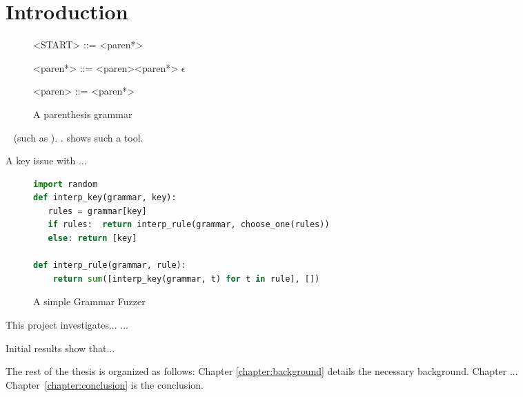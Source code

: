 \chapter{Introduction}\label{chapter:intro}

\lipsum[20]

\begin{wrapfigure}{r}{0.35\textwidth}
\small
\center
\begin{grammar}
<START> ::= <paren*>

<paren*> ::= <paren><paren*>
\alt $\epsilon$

<paren>  ::= \term{(} <paren*> \term{)}
\end{grammar}
\caption{A parenthesis grammar}
\label{fig:parenthesis}
\end{wrapfigure}
\lipsum[10]~\cite{Gopinath2019} \lipsum[100] (such as ). \lipsum[100].  shows such a tool.

A key issue with  ...

\begin{figure}
\small
\begin{lstlisting}[language=Python]
import random
def interp_key(grammar, key):
   rules = grammar[key]
   if rules:  return interp_rule(grammar, choose_one(rules)) 
   else: return [key]

def interp_rule(grammar, rule):
    return sum([interp_key(grammar, t) for t in rule], [])

\end{lstlisting}
\caption{A simple Grammar Fuzzer}
\label{fig:grammarfuzzer}
\end{figure}

This project investigates...
...\lipsum[100]

Initial results show that...
\lipsum[100]

The rest of the thesis is organized as follows: Chapter \ref{chapter:background} details the necessary background. Chapter ... Chapter~\ref{chapter:conclusion} is the conclusion.